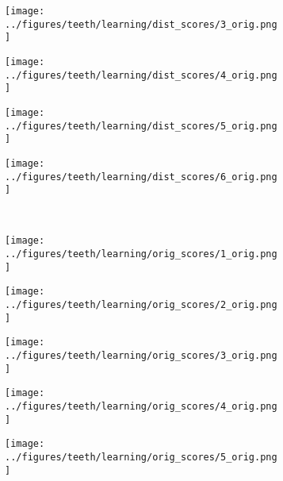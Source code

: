 \begin{figure}[h!]
\begin{subfigure}{0.15\textwidth}
	\end{subfigure}
	\begin{subfigure}{0.15\textwidth}
		\centering
		\texttt{[image: ../figures/teeth/learning/dist\_scores/3\_orig.png]}
		\label{fig:1}
	\end{subfigure}
	\begin{subfigure}{0.15\textwidth}
		\centering
		\texttt{[image: ../figures/teeth/learning/dist\_scores/4\_orig.png]}
		\label{fig:1}
	\end{subfigure}
	\begin{subfigure}{0.15\textwidth}
		\centering
		\texttt{[image: ../figures/teeth/learning/dist\_scores/5\_orig.png]}
		\label{fig:1}
	\end{subfigure}
	\begin{subfigure}{0.15\textwidth}
		\centering
		\texttt{[image: ../figures/teeth/learning/dist\_scores/6\_orig.png]}
		\label{fig:1}
	\end{subfigure}
		\vspace{-0.35cm}
	\\
		\begin{subfigure}[b]{0.03\textwidth} %
		\centering
	\end{subfigure}
		\begin{subfigure}{0.15\textwidth}
		\centering
		\texttt{[image: ../figures/teeth/learning/orig\_scores/1\_orig.png]}
		\label{fig:1}
	\end{subfigure}
	\begin{subfigure}{0.15\textwidth}
		\centering
		\texttt{[image: ../figures/teeth/learning/orig\_scores/2\_orig.png]}
		\label{fig:1}
	\end{subfigure}
	\begin{subfigure}{0.15\textwidth}
		\centering
		\texttt{[image: ../figures/teeth/learning/orig\_scores/3\_orig.png]}
		\label{fig:1}
	\end{subfigure}
	\begin{subfigure}{0.15\textwidth}
		\centering
		\texttt{[image: ../figures/teeth/learning/orig\_scores/4\_orig.png]}
		\label{fig:1}
	\end{subfigure}
	\begin{subfigure}{0.15\textwidth}
		\centering
		\texttt{[image: ../figures/teeth/learning/orig\_scores/5\_orig.png]}
		\label{fig:1}

\end{subfigure}
\end{figure}
